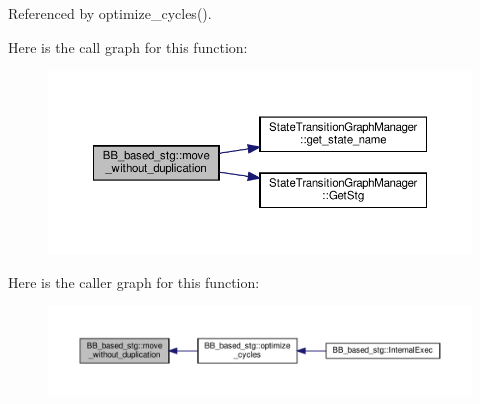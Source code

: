Referenced by optimize\+\_\+cycles().

Here is the call graph for this function\+:
\nopagebreak
\begin{figure}[H]
\begin{center}
\leavevmode
\includegraphics[width=350pt]{dd/d84/classBB__based__stg_aecadba799040dd72068eb6805f7f53e2_cgraph}
\end{center}
\end{figure}
Here is the caller graph for this function\+:
\nopagebreak
\begin{figure}[H]
\begin{center}
\leavevmode
\includegraphics[width=350pt]{dd/d84/classBB__based__stg_aecadba799040dd72068eb6805f7f53e2_icgraph}
\end{center}
\end{figure}
\mbox{\label{classBB__based__stg_a949d51a84f969e119444a89cd98e8d15}} 
